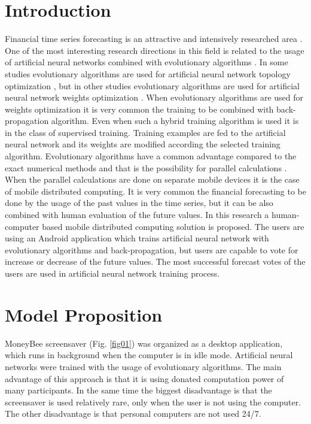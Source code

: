 \documentclass[runningheads]{llncs}
\begin{document}
\section{Introduction} \label{Introduction}

Financial time series forecasting is an attractive and intensively researched area \cite{nava01}. One of the most interesting research directions in this field is related to the usage of artificial neural networks combined with evolutionary algorithms \cite{zhang01}. In some studies evolutionary algorithms are used for artificial neural network topology optimization \cite{kapanova01}, but in other studies evolutionary algorithms are used for artificial neural network weights optimization \cite{aljarah01}. When evolutionary algorithms are used for weights optimization it is very common the training to be combined with back-propagation algorithm. Even when such a hybrid training algorithm is used it is in the class of supervised training. Training examples are fed to the artificial neural network and its weights are modified according the selected training algorithm. Evolutionary algorithms have a common advantage compared to the exact numerical methods and that is the possibility for parallel calculations \cite{altinoz01}. When the parallel calculations are done on separate mobile devices it is the case of mobile distributed computing. It is very common the financial forecasting to be done by the usage of the past values in the time series, but it can be also combined with human evaluation of the future values. In this research a human-computer based mobile distributed computing solution is proposed. The users are using an Android application which trains artificial neural network with evolutionary algorithms and back-propagation, but users are capable to vote for increase or decrease of the future values. The most successful forecast votes of the users are used in artificial neural network training process.

\section{Model Proposition} \label{Model Proposition}

MoneyBee screensaver (Fig. \ref{fig01}) was organized as a desktop application, which runs in background when the computer is in idle mode. Artificial neural networks were trained with the usage of evolutionary algorithms. The main advantage of this approach is that it is using donated computation power of many participants. In the same time the biggest disadvantage is that the screensaver is used relatively rare, only when the user is not using the computer. The other disadvantage is that personal computers are not used 24/7.
\end{document}
